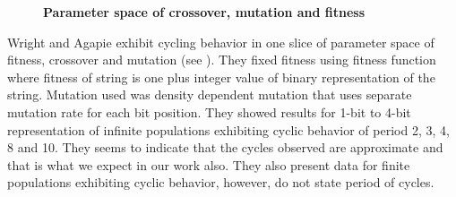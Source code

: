\begin{itemize}
{\begin{figure}[h]
\begin{center}
\hspace{-3em}%
\caption[\textbf{Parameter space of crossover, mutation and fitness}]{\textbf{Parameter space of crossover, mutation and fitness}  }
\label{fig_cmf}
\end{center}
\end{figure}

Wright and Agapie exhibit cycling behavior in one slice of parameter space of fitness, crossover and mutation (see \cite{Wright2001}). 
They fixed fitness using fitness function where fitness of string is one plus integer value of binary representation of the string. 
Mutation used was density dependent mutation that uses separate mutation rate for each bit position. 
They showed results for 1-bit to 4-bit 
representation of infinite populations exhibiting cyclic behavior of period 2, 3, 4, 8 and 10. 
They seems to indicate that the cycles observed are approximate and that is what we expect in our work also. 
They also present data for finite populations exhibiting cyclic behavior, however, do not state period of cycles. 

}
\end{itemize}
